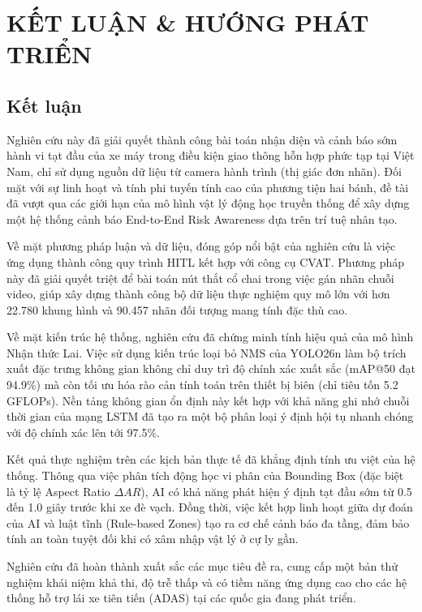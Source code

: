 \chapter{KẾT LUẬN \& HƯỚNG PHÁT TRIỂN}
	\section{Kết luận}
	Nghiên cứu này đã giải quyết thành công bài toán nhận diện và cảnh báo sớm hành vi tạt đầu của xe máy trong điều kiện giao thông hỗn hợp phức tạp tại Việt Nam, chỉ sử dụng nguồn dữ liệu từ camera hành trình (thị giác đơn nhãn). Đối mặt với sự linh hoạt và tính phi tuyến tính cao của phương tiện hai bánh, đề tài đã vượt qua các giới hạn của mô hình vật lý động học truyền thống để xây dựng một hệ thống cảnh báo End-to-End Risk Awareness dựa trên trí tuệ nhân tạo.
	
	Về mặt phương pháp luận và dữ liệu, đóng góp nổi bật của nghiên cứu là việc ứng dụng thành công quy trình HITL kết hợp với công cụ CVAT. Phương pháp này đã giải quyết triệt để bài toán nút thắt cổ chai trong việc gán nhãn chuỗi video, giúp xây dựng thành công bộ dữ liệu thực nghiệm quy mô lớn với hơn 22.780 khung hình và 90.457 nhãn đối tượng mang tính đặc thù cao.
	
	Về mặt kiến trúc hệ thống, nghiên cứu đã chứng minh tính hiệu quả của mô hình Nhận thức Lai. Việc sử dụng kiến trúc loại bỏ NMS của YOLO26n làm bộ trích xuất đặc trưng không gian không chỉ duy trì độ chính xác xuất sắc (mAP@50 đạt 94.9\%) mà còn tối ưu hóa rào cản tính toán trên thiết bị biên (chỉ tiêu tốn 5.2 GFLOPs). Nền tảng không gian ổn định này kết hợp với khả năng ghi nhớ chuỗi thời gian của mạng LSTM đã tạo ra một bộ phân loại ý định hội tụ nhanh chóng với độ chính xác lên tới 97.5\%. 
	
	Kết quả thực nghiệm trên các kịch bản thực tế đã khẳng định tính ưu việt của hệ thống. Thông qua việc phân tích động học vi phân của Bounding Box (đặc biệt là tỷ lệ Aspect Ratio $\Delta AR$), AI có khả năng phát hiện ý định tạt đầu sớm từ 0.5 đến 1.0 giây trước khi xe đè vạch. Đồng thời, việc kết hợp linh hoạt giữa dự đoán của AI và luật tĩnh (Rule-based Zones) tạo ra cơ chế cảnh báo đa tầng, đảm bảo tính an toàn tuyệt đối khi có xâm nhập vật lý ở cự ly gần. 
	
	Nghiên cứu đã hoàn thành xuất sắc các mục tiêu đề ra, cung cấp một bản thử nghiệm khái niệm khả thi, độ trễ thấp và có tiềm năng ứng dụng cao cho các hệ thống hỗ trợ lái xe tiên tiến (ADAS) tại các quốc gia đang phát triển.

